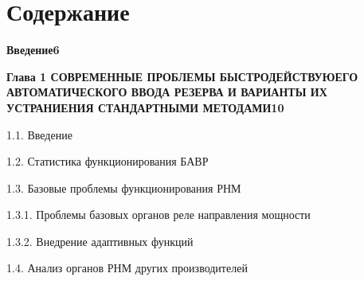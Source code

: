 
\chapter*{Содержание}
\vspace{0.5cm}

\noindent\textbf{Введение}\dotfill\textbf{6}\par\vspace{1.5mm}
\noindent\textbf{Глава 1 СОВРЕМЕННЫЕ ПРОБЛЕМЫ БЫСТРОДЕЙСТВУЮЕГО АВТОМАТИЧЕСКОГО ВВОДА РЕЗЕРВА И ВАРИАНТЫ ИХ УСТРАНИЕНИЯ СТАНДАРТНЫМИ МЕТОДАМИ}\dotfill\textbf{10}\par\vspace{1.5mm}
\noindent\hspace*{1.5em}1.1. Введение\par\vspace{0.5mm}
\noindent\hspace*{1.5em}1.2. Статистика функционирования БАВР\par\vspace{0.5mm}
\noindent\hspace*{1.5em}1.3. Базовые проблемы функционирования РНМ\par\vspace{0.5mm}
\noindent\hspace*{3.0em}1.3.1. Проблемы базовых органов реле направления мощности\par\vspace{0.5mm}
\noindent\hspace*{3.0em}1.3.2. Внедрение адаптивных функций\par\vspace{0.5mm}
\noindent\hspace*{1.5em}1.4. Анализ органов РНМ других производителей\par\vspace{0.5mm}
